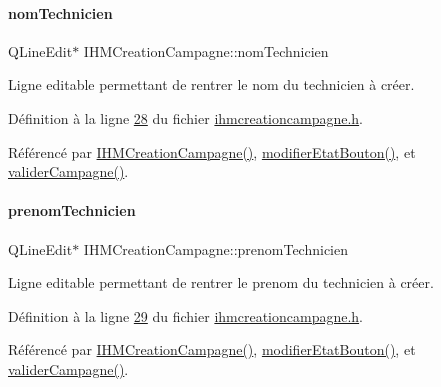 \paragraph{\texorpdfstring{nom\+Technicien}{nomTechnicien}}
{\footnotesize\ttfamily Q\+Line\+Edit$\ast$ I\+H\+M\+Creation\+Campagne\+::nom\+Technicien\hspace{0.3cm}{\ttfamily [private]}}



Ligne editable permettant de rentrer le nom du technicien à créer. 



Définition à la ligne \hyperlink{ihmcreationcampagne_8h_source_l00028}{28} du fichier \hyperlink{ihmcreationcampagne_8h_source}{ihmcreationcampagne.\+h}.



Référencé par \hyperlink{ihmcreationcampagne_8cpp_source_l00011}{I\+H\+M\+Creation\+Campagne()}, \hyperlink{ihmcreationcampagne_8cpp_source_l00086}{modifier\+Etat\+Bouton()}, et \hyperlink{ihmcreationcampagne_8cpp_source_l00071}{valider\+Campagne()}.

\mbox{\label{class_i_h_m_creation_campagne_a95e0a4f224110a79731e947baa505b7e}} 
\paragraph{\texorpdfstring{prenom\+Technicien}{prenomTechnicien}}
{\footnotesize\ttfamily Q\+Line\+Edit$\ast$ I\+H\+M\+Creation\+Campagne\+::prenom\+Technicien\hspace{0.3cm}{\ttfamily [private]}}



Ligne editable permettant de rentrer le prenom du technicien à créer. 



Définition à la ligne \hyperlink{ihmcreationcampagne_8h_source_l00029}{29} du fichier \hyperlink{ihmcreationcampagne_8h_source}{ihmcreationcampagne.\+h}.



Référencé par \hyperlink{ihmcreationcampagne_8cpp_source_l00011}{I\+H\+M\+Creation\+Campagne()}, \hyperlink{ihmcreationcampagne_8cpp_source_l00086}{modifier\+Etat\+Bouton()}, et \hyperlink{ihmcreationcampagne_8cpp_source_l00071}{valider\+Campagne()}.

